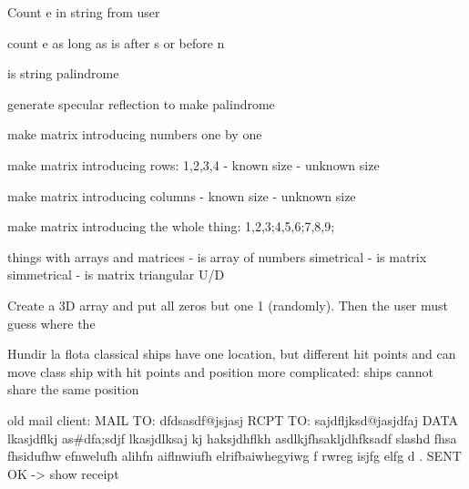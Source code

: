 Count e in string from user

count e as long as is after s or before n

is string palindrome

generate specular reflection to make palindrome

make matrix introducing numbers one by one

make matrix introducing rows: 1,2,3,4
  - known size
  - unknown size

make matrix introducing columns
  - known size
  - unknown size

make matrix introducing the whole thing: 1,2,3;4,5,6;7,8,9;


things with arrays and matrices
  - is array of numbers simetrical
  - is matrix simmetrical
  - is matrix triangular U/D

Create a 3D array and put all zeros but one 1 (randomly). Then the
user must guess where the 

Hundir la flota
  classical
  ships have one location, but different hit points and can move
     class ship with hit points and position
     more complicated: ships cannot share the same position








old mail client: 
  MAIL TO: dfdsasdf@jsjasj
  RCPT TO: sajdfljksd@jasjdfaj
  DATA
   lkasjdflkj as#dfa;sdjf lkasjdlksaj kj haksjdhflkh
   asdlkjfhsakljdhfksadf slashd fhsa fhsidufhw efnwelufh alihfn
   aiflnwiufh elrifbaiwhegyiwg f rwreg
   isjfg elfg d
   .
  SENT OK -> show receipt
